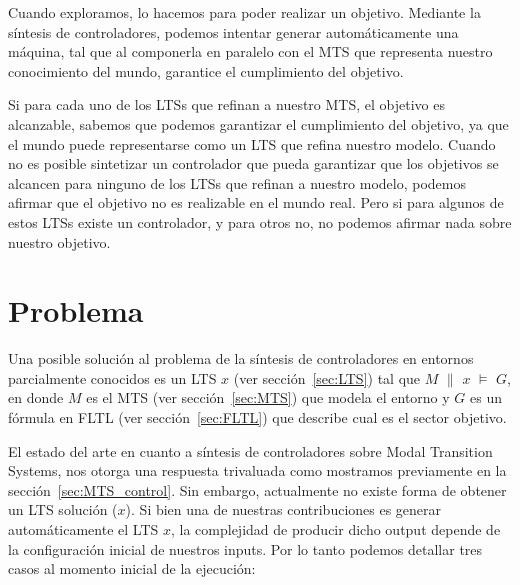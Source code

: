 Cuando exploramos, lo hacemos para poder realizar un objetivo. Mediante la 
síntesis de controladores, podemos intentar 
generar automáticamente una máquina, tal que al componerla en paralelo con el 
MTS que representa nuestro conocimiento 
del mundo, garantice el cumplimiento del objetivo.

Si para cada uno de los LTSs que refinan a nuestro MTS, el objetivo es 
alcanzable, sabemos que podemos garantizar el
cumplimiento del objetivo, ya que el mundo puede representarse como un LTS que 
refina nuestro modelo. Cuando no es posible
sintetizar un controlador que pueda garantizar que los objetivos se alcancen 
para ninguno de los LTSs que refinan a nuestro
modelo, podemos afirmar que el objetivo no es realizable en el mundo real. Pero 
si para algunos de estos LTSs existe un
controlador, y para otros no, no podemos afirmar nada sobre nuestro objetivo.


\section{Problema}





Una posible solución al problema de la síntesis de controladores en entornos 
parcialmente conocidos es un LTS $x$ (ver sección~\ref{sec:LTS}) tal que 
$M$ $\parallel$ $x$ $\models$ $G$, en donde $M$ es el MTS (ver 
sección~\ref{sec:MTS}) que modela el entorno y $G$ es un fórmula en FLTL (ver 
sección~\ref{sec:FLTL}) que describe cual es el sector objetivo. 





El estado del arte en cuanto a síntesis de controladores sobre Modal Transition 
Systems, nos otorga una respuesta trivaluada como mostramos previamente en la 
sección~\ref{sec:MTS_control}. Sin embargo, actualmente no existe forma de 
obtener un LTS solución ($x$). Si bien una de nuestras contribuciones es 
generar automáticamente el LTS $x$, la complejidad de producir dicho output 
depende de la configuración inicial de nuestros inputs. 
Por lo tanto podemos detallar tres casos al momento inicial de la ejecución:

